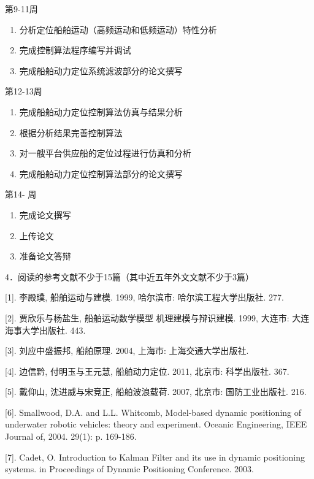 \documentclass[a4paper,fontset=fandol]{ctexart}
\begin{document}
\begin{mdframed}
{\large \fangsong 

第9-11周
\begin{enumerate}
\item 分析定位船舶运动（高频运动和低频运动）特性分析
\item 完成控制算法程序编写并调试
\item 完成船舶动力定位系统滤波部分的论文撰写
\end{enumerate}


第12-13周
\begin{enumerate}
\item 完成船舶动力定位控制算法仿真与结果分析
\item 根据分析结果完善控制算法
\item 对一艘平台供应船的定位过程进行仿真和分析
\item 完成船舶动力定位控制算法部分的论文撰写
\end{enumerate}


第14- 周
\begin{enumerate}
\item 完成论文撰写
\item 上传论文
\item 准备论文答辩
 
\end{enumerate}


\begin{flushleft}
4．阅读的参考文献不少于15篇（其中近五年外文文献不少于3篇）
\end{flushleft}

[1].	李殿璞, 船舶运动与建模. 1999, 哈尔滨市: 哈尔滨工程大学出版社. 277.

 [2].	贾欣乐与杨盐生, 船舶运动数学模型  机理建模与辩识建模. 1999, 大连市: 大连海事大学出版社. 443.
 
 [3].	刘应中盛振邦, 船舶原理. 2004, 上海市: 上海交通大学出版社.
 
 [4].	边信黔, 付明玉与王元慧, 船舶动力定位. 2011, 北京市: 科学出版社. 367.
 
 [5].	戴仰山, 沈进威与宋竞正, 船舶波浪载荷. 2007, 北京市: 国防工业出版社. 216.
 
 [6].	Smallwood, D.A. and L.L. Whitcomb, Model-based dynamic positioning of underwater robotic vehicles: theory and experiment. Oceanic Engineering, IEEE Journal of, 2004. 29(1): p. 169-186.
 
 [7].	Cadet, O. Introduction to Kalman Filter and its use in dynamic positioning systems. in Proceedings of Dynamic Positioning Conference. 2003.
 }
 \end{mdframed}
 
\end{document}

